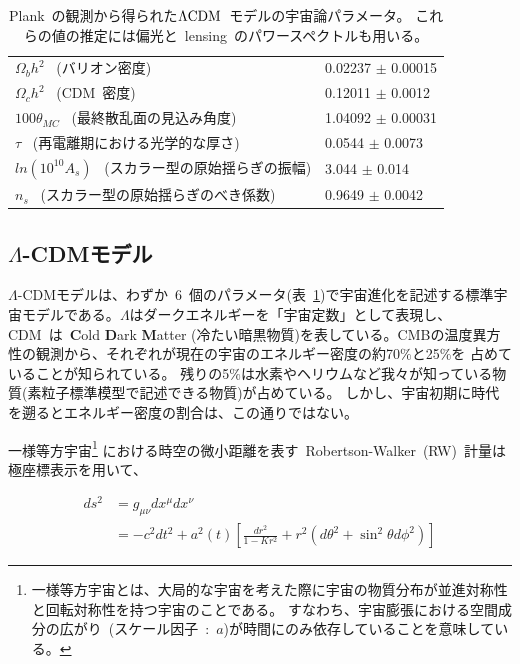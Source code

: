 \vspace{2mm}
\begin{table}[htbp]
  \centering
  \caption{Plank~の観測から得られた$\Lambda {\rm CDM}$~モデルの宇宙論パラメータ\cite{plank}。
  これらの値の推定には偏光と~lensing~のパワースペクトルも用いる。}
  \vspace{2mm}
  \begin{tabular}{l|l}\hline
    $\Omega_b h^2$ ~(バリオン密度)& 0.02237 $\pm$ 0.00015 \\
    $\Omega_c h^2$ ~(CDM~密度)& 0.12011 $\pm$ 0.0012 \\
    $100 \theta_{MC}$ ~(最終散乱面の見込み角度) & 1.04092 $\pm$ 0.00031 \\
    $\tau$ ~(再電離期における光学的な厚さ)& 0.0544 $\pm$ 0.0073 \\
    $ln(10^{10}A_s)$ ~(スカラー型の原始揺らぎの振幅) & 3.044 $\pm$ 0.014 \\
    $n_s$ ~(スカラー型の原始揺らぎのべき係数)& 0.9649 $\pm$ 0.0042 \\ \hline
  \end{tabular}
  \label{plank_cospar}
\end{table}



\subsection{$\Lambda$-CDMモデル}
$\Lambda$-CDMモデルは、わずか~6~個のパラメータ(表~\ref{plank_cospar})で宇宙進化を記述する標準宇宙モデルである。$\Lambda$はダークエネルギーを「宇宙定数」として表現し、CDM~は~{\bf C}old {\bf D}ark {\bf M}atter
(冷たい暗黒物質)を表している。CMBの温度異方性の観測\cite{plank}から、それぞれが現在の宇宙のエネルギー密度の約70$\%$と25$\%$を
占めていることが知られている。
残りの5$\%$は水素やヘリウムなど我々が知っている物質(素粒子標準模型で記述できる物質)が占めている。
しかし、宇宙初期に時代を遡るとエネルギー密度の割合は、この通りではない。

一様等方宇宙\footnote{一様等方宇宙とは、大局的な宇宙を考えた際に宇宙の物質分布が並進対称性と回転対称性を持つ宇宙のことである。
すなわち、宇宙膨張における空間成分の広がり~(スケール因子~:~$a$)が時間にのみ依存していることを意味している。}
における時空の微小距離を表す~Robertson-Walker~(RW)~計量は極座標表示を用いて、

\begin{equation}
  \begin{split}
  ds^2 &= g_{\mu \nu} dx^{\mu} dx^{\nu}\\
       &= -c^2dt^2 + a^2(t) \left[\frac{dr^2}{1-Kr^2} + r^2(d{\theta}^2 + \sin^2{\theta}d{\phi}^2)\right]
  \end{split}
  \label{flrw}
\end{equation}
\fi

